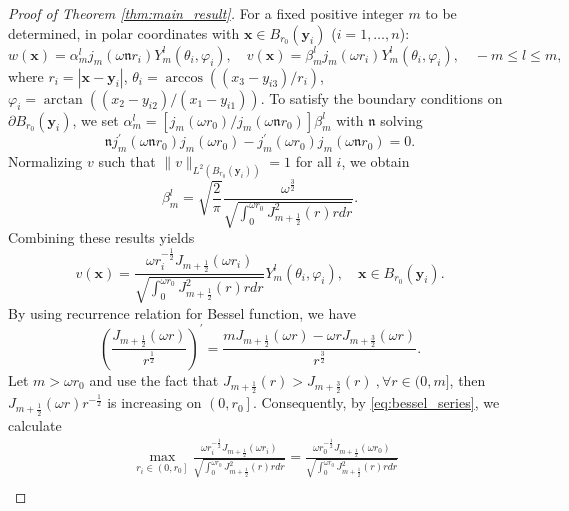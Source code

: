 \documentclass[11pt,reqno,oneside]{amsart}
\numberwithin{equation}{section}
\theoremstyle{definition}
\theoremstyle{remark}
\numberwithin{equation}{section}
\begin{document}
\begin{proof}[Proof of Theorem \ref{thm:main_result}]
		\item[\textbf{Case 1}: $d=3.$] For a fixed positive integer $m$ to be determined, in polar coordinates with $\mathbf{x} \in B_{r_0}(\mathbf{y}_i)$ ($i=1,\dots,n$):
		\begin{equation*}
			w(\mathbf{x}) = \alpha_{m}^{l} j_m(\omega \mathfrak{n} r_i) Y_{m}^{l}(\theta_i, \varphi_i), \quad
			v(\mathbf{x}) = \beta_{m}^{l} j_m(\omega r_i) Y_{m}^{l}(\theta_i, \varphi_i), \quad -m \leqslant l \leqslant m,
		\end{equation*}
		where $r_i = |\mathbf{x}-\mathbf{y}_i|$, $\theta_i = \arccos((x_3-y_{i3})/r_i)$, $\varphi_i = \arctan((x_2-y_{i2})/(x_1-y_{i1}))$. To satisfy the boundary conditions on $\partial B_{r_0}(\mathbf{y}_i)$, we set $\alpha^l_m = [j_m(\omega r_0)/j_m(\omega \mathfrak{n} r_0)] \beta^l_m$ with $\mathfrak{n}$ solving
		\begin{equation*}
			\mathfrak{n} j_{m}^\prime(\omega \mathfrak{n} r_0) j_{m}(\omega r_0) - j_{m}^\prime(\omega r_0) j_{m}(\omega \mathfrak{n} r_0) = 0.
		\end{equation*}
		Normalizing $v$ such that $\|v\|_{L^2(B_{r_0}(\mathbf{y}_i))} = 1$ for all $i$, we obtain
		\begin{equation*}
			\beta_m^l = \sqrt{\frac{2}{\pi}} \frac{\omega^{\frac{3}{2}}}{\sqrt{\int_0^{\omega r_0} J^2_{m+\frac{1}{2}}(r) r  dr}}.
		\end{equation*}
		Combining these results yields
		\begin{equation}\label{v in d=3}
			v(\mathbf{x}) = \frac{\omega r_i^{-\frac{1}{2}} J_{m+\frac{1}{2}}(\omega r_i)}{\sqrt{\int_0^{\omega r_0} J_{m+\frac{1}{2}}^2(r) r  dr}} Y_m^l(\theta_i, \varphi_i), \quad \mathbf{x} \in B_{r_0}(\mathbf{y}_i).
		\end{equation}
		By using recurrence relation for Bessel function, we have
		\begin{equation*}
			\left(\frac{J_{m+\frac{1}{2}}(\omega r)}{r^{\frac{1}{2}}}\right)^{\prime}=\frac{m J_{m+\frac{1}{2}}(\omega r)-\omega r J_{m+\frac{3}{2}}(\omega r) }{r^{\frac{3}{2}}}.
		\end{equation*}
		Let $m>\omega r_0$ and use the fact that $J_{m+\frac{1}{2}}(r)>J_{m+\frac{3}{2}}(r)~ ,\forall r \in (0,m]$, then $J_{m+\frac{1}{2}}(\omega r) r^{-\frac{1}{2}}$ is increasing on $\left(0, r_0\right]$. Consequently, by \eqref{eq:bessel_series}, we calculate
		\begin{equation*}
			\begin{aligned}
				&\max _{r_i \in\left(0, r_0\right]}\frac{\omega {r_i^{-\frac{1}{2}}} J_{m+\frac{1}{2}}(\omega r_i)}{\sqrt{\int_0^{\omega r_0} J_{m+\frac{1}{2}}^2(r) r d r}} =\frac{\omega{r_0^{-\frac{1}{2}}} J_{m+\frac{1}{2}}(\omega r_0)}{\sqrt{\int_0^{\omega r_0} J_{m+\frac{1}{2}}^2(r) r d r}}\\

\end{aligned}
\end{equation*}
\end{proof}
\end{document}
